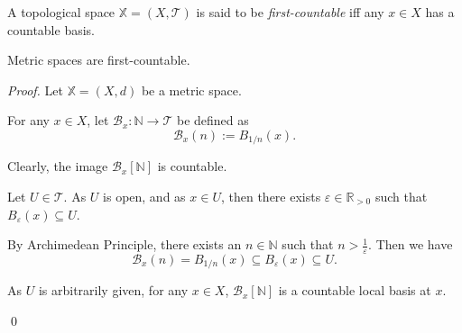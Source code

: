 \begin{definition}
	\label{def: first-countable}
	A topological space $\mathbb X = (X, \mathcal T)$ is said to be \textit{first-countable} iff any $x \in X$ has a countable basis.
\end{definition}


\begin{proposition}
	Metric spaces are first-countable.
	
	\begin{proof}
		Let $\mathbb X = (X, d)$ be a metric space.
		
		For any $x \in X$, let $\mathcal B_x: \mathbb N \to \mathcal T$ be defined as
		$$
		\mathcal B_x(n) := B_{1/n} (x).
		$$
		
		Clearly, the image $\mathcal B_x[\mathbb N]$ is countable.
		
		Let $U \in \mathcal T$. As $U$ is open, and as $x \in U$, then there exists $\varepsilon \in \mathbb R_{> 0}$ such that $B_\varepsilon(x) \subseteq U$.
		
		By Archimedean Principle, there exists an $n \in \mathbb N$ such that $n > \frac{1}{\varepsilon}$. Then we have
		$$
		\mathcal B_x(n) = B_{1/n}(x) \subseteq B_\varepsilon(x) \subseteq U.
		$$
		
		As $U$ is arbitrarily given, for any $x \in X$, $\mathcal B_x[\mathbb N]$ is a countable local basis at $x$.
		
		\qed
	\end{proof}
\end{proposition}



